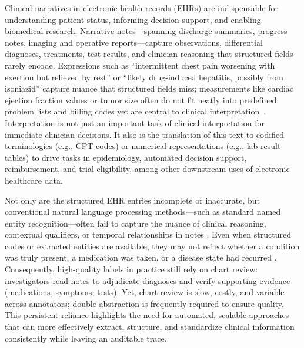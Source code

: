 Clinical narratives in electronic health records (EHRs) are indispensable for understanding patient status, informing decision support, and enabling biomedical research. Narrative notes—spanning discharge summaries, progress notes, imaging and operative reports—capture observations, differential diagnoses, treatments, test results, and clinician reasoning that structured fields rarely encode. Expressions such as ``intermittent chest pain worsening with exertion but relieved by rest'' or ``likely drug-induced hepatitis, possibly from isoniazid'' capture nuance that structured fields miss; measurements like cardiac ejection fraction values or tumor size often do not fit neatly into predefined problem lists and billing codes yet are central to clinical interpretation~. Interpretation is not just an important task of clinical interpretation for immediate clinician decisions. It also is the translation of this text to codified terminologies (e.g., CPT codes) or numerical representations (e.g., lab result tables) to drive tasks in epidemiology, automated decision support, reimbursement, and trial eligibility, among other downstream uses of electronic healthcare data.

Not only are the structured EHR entries incomplete or inaccurate, but conventional natural language processing methods—such as standard named entity recognition—often fail to capture the nuance of clinical reasoning, contextual qualifiers, or temporal relationships in notes \cite{Kohane_2021}. Even when structured codes or extracted entities are available, they may not reflect whether a condition was truly present, a medication was taken, or a disease state had recurred \cite{Kim_2023}. Consequently, high-quality labels in practice still rely on chart review: investigators read notes to adjudicate diagnoses and verify supporting evidence (medications, symptoms, tests). Yet, chart review is slow, costly, and variable across annotators; double abstraction is frequently required to ensure quality. This persistent reliance highlights the need for automated, scalable approaches that can more effectively extract, structure, and standardize clinical information consistently while leaving an auditable trace.

